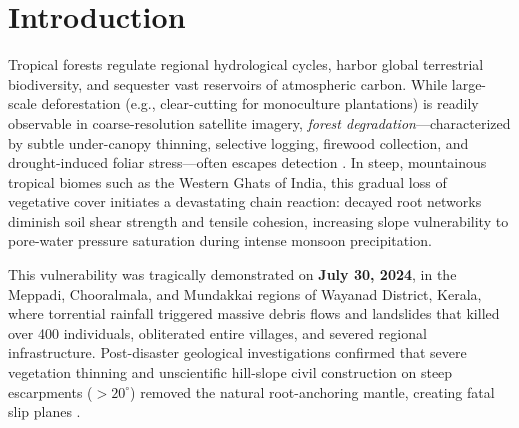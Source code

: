 \documentclass[conference]{IEEEtran}
\begin{document}
\section{Introduction}
Tropical forests regulate regional hydrological cycles, harbor global terrestrial biodiversity, and sequester vast reservoirs of atmospheric carbon. While large-scale deforestation (e.g., clear-cutting for monoculture plantations) is readily observable in coarse-resolution satellite imagery, \textit{forest degradation}—characterized by subtle under-canopy thinning, selective logging, firewood collection, and drought-induced foliar stress—often escapes detection \cite{hansen2013high}. In steep, mountainous tropical biomes such as the Western Ghats of India, this gradual loss of vegetative cover initiates a devastating chain reaction: decayed root networks diminish soil shear strength and tensile cohesion, increasing slope vulnerability to pore-water pressure saturation during intense monsoon precipitation.

This vulnerability was tragically demonstrated on \textbf{July 30, 2024}, in the Meppadi, Chooralmala, and Mundakkai regions of Wayanad District, Kerala, where torrential rainfall triggered massive debris flows and landslides that killed over 400 individuals, obliterated entire villages, and severed regional infrastructure. Post-disaster geological investigations confirmed that severe vegetation thinning and unscientific hill-slope civil construction on steep escarpments ($>20^\circ$) removed the natural root-anchoring mantle, creating fatal slip planes \cite{gsi2024wayanad}.
\end{document}
